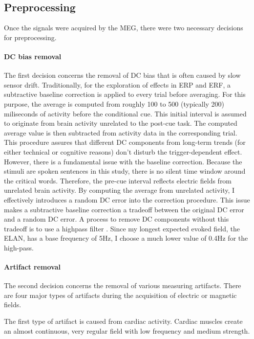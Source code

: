 \subsection{Preprocessing}

Once the signals were acquired by the MEG, there were two necessary decisions for preprocessing.

\paragraph{DC bias removal}
The first decision concerns the removal of DC bias that is often caused by slow sensor drift.
Traditionally, for the exploration of effects in ERP and ERF, a subtractive baseline correction is applied to every trial before averaging.
For this purpose, the average is computed from roughly 100 to 500 (typically 200) miliseconds of activity before the conditional cue.
This initial interval is assumed to originate from brain activity unrelated to the post-cue task.
The computed average value is then subtracted from activity data in the corresponding trial.
This procedure assures that different DC components from long-term trends (for either technical or cognitive reasons) don't disturb the trigger-dependent effect.
However, there is a fundamental issue with the baseline correction.
Because the stimuli are spoken sentences in this study, there is no silent time window around the critical words.
Therefore, the pre-cue interval reflects electric fields from unrelated brain activity.
By computing the average from unrelated activity, I effectively introduces a random DC error into the correction procedure.
This issue makes a subtractive baseline correction a tradeoff between the original DC error and a random DC error.
A process to remove DC components without this tradeoff is to use a highpass filter \cite{1.5.highpass}.
Since my longest expected evoked field, the ELAN, has a base frequency of 5Hz, I choose a much lower value of 0.4Hz for the high-pass.

\paragraph{Artifact removal}
The second decision concerns the removal of various measuring artifacts.
There are four major types of artifacts during the acquisition of electric or magnetic fields.

The first type of artifact is caused from cardiac activity.
Cardiac muscles create an almost continuous, very regular field with low frequency and medium strength.

